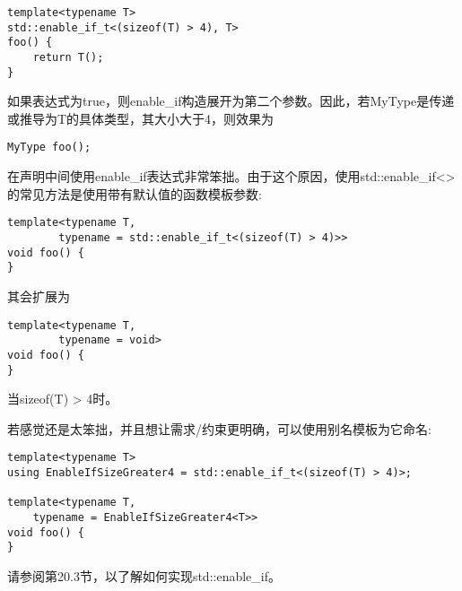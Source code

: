 \begin{lstlisting}[style=styleCXX]
template<typename T>
std::enable_if_t<(sizeof(T) > 4), T>
foo() {
	return T();
}
\end{lstlisting}

如果表达式为true，则enable\_if构造展开为第二个参数。因此，若MyType是传递或推导为T的具体类型，其大小大于4，则效果为

\begin{lstlisting}[style=styleCXX]
MyType foo();
\end{lstlisting}

在声明中间使用enable\_if表达式非常笨拙。由于这个原因，使用std::enable\_if<>的常见方法是使用带有默认值的函数模板参数: 

\begin{lstlisting}[style=styleCXX]
template<typename T,
		typename = std::enable_if_t<(sizeof(T) > 4)>>
void foo() {
}
\end{lstlisting}

其会扩展为

\begin{lstlisting}[style=styleCXX]
template<typename T,
		typename = void>
void foo() {
}
\end{lstlisting}

当sizeof(T) > 4时。

若感觉还是太笨拙，并且想让需求/约束更明确，可以使用别名模板为它命名:

\begin{lstlisting}[style=styleCXX]
template<typename T>
using EnableIfSizeGreater4 = std::enable_if_t<(sizeof(T) > 4)>;

template<typename T,
	typename = EnableIfSizeGreater4<T>>
void foo() {
}
\end{lstlisting}

请参阅第20.3节，以了解如何实现std::enable\_if。










